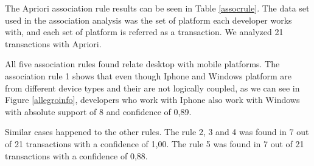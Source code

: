 \documentclass[10pt, conference]{IEEEtran}
\begin{document}



The Apriori association rule results can be seen in Table \ref{assocrule}. The data set used in the association analysis was the set of platform each developer works with, and each set of platform is referred as a transaction. We analyzed 21 transactions with Apriori. 

All five association rules found relate desktop with mobile platforms. The association rule 1 shows that even though Iphone and Windows platform are from different device types and their are not logically coupled, as we can see in Figure \ref{allegroinfo}, developers who work with Iphone also work with Windows with absolute support of 8 and confidence of 0,89. 

Similar cases happened to the other rules. The rule 2, 3 and 4 was found in 7 out of 21  transactions with a confidence of 1,00.  The rule 5 was found in 7 out of 21 transactions with a confidence of 0,88. 


\end{document}
